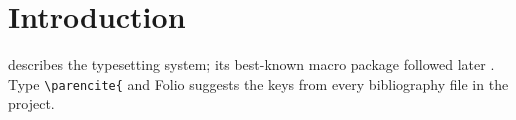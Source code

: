 \section{Introduction}
\textcite{knuth1984} describes the typesetting system; its best-known macro
package followed later \parencite{lamport1994}. Type \verb|\parencite{| and
Folio suggests the keys from every bibliography file in the project.
